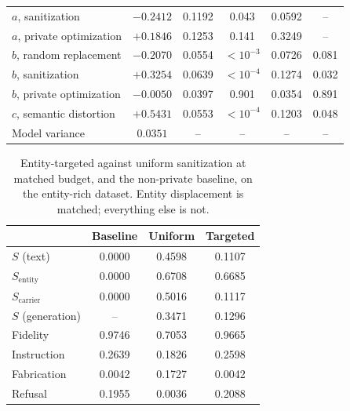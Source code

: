 \begin{table}[t]
\begin{tabular}{lccccc}
    $a$, sanitization           & $-0.2412$ & 0.1192 & 0.043 & 0.0592 & -- \\
    $a$, private optimization   & $+0.1846$ & 0.1253 & 0.141 & 0.3249 & -- \\
    $b$, random replacement     & $-0.2070$ & 0.0554 & $<10^{-3}$ & 0.0726 & 0.081 \\
    $b$, sanitization           & $+0.3254$ & 0.0639 & $<10^{-4}$ & 0.1274 & 0.032 \\
    $b$, private optimization   & $-0.0050$ & 0.0397 & 0.901 & 0.0354 & 0.891 \\
    $c$, semantic distortion    & $+0.5431$ & 0.0553 & $<10^{-4}$ & 0.1203 & 0.048 \\
    Model variance              & $0.0351$ & -- & -- & -- & -- \\
    \bottomrule
  \end{tabular}
\end{table}

\begin{table}[t]
  \centering
  \caption{Entity-targeted against uniform sanitization at matched budget,
  and the non-private baseline,
  on the entity-rich dataset.
  Entity displacement is matched;
  everything else is not.}
  \label{tab:targeted}
  \begin{tabular}{lccc}
    \toprule
    & Baseline & Uniform & Targeted \\
    \midrule
    $S$ (text)            & 0.0000 & 0.4598 & 0.1107 \\
    $S_{\text{entity}}$   & 0.0000 & 0.6708 & 0.6685 \\
    $S_{\text{carrier}}$  & 0.0000 & 0.5016 & 0.1117 \\
    $S$ (generation)      & --    & 0.3471 & 0.1296 \\
    \midrule
    Fidelity              & 0.9746 & 0.7053 & 0.9665 \\
    Instruction           & 0.2639 & 0.1826 & 0.2598 \\
    Fabrication           & 0.0042 & 0.1727 & 0.0042 \\
    Refusal               & 0.1955 & 0.0036 & 0.2088 \\
    \bottomrule
  \end{tabular}
\end{table}

